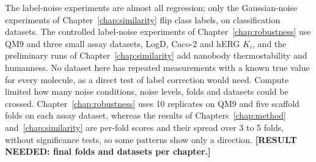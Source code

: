 The label-noise experiments are almost all regression; only the Gaussian-noise experiments of Chapter~\ref{chap:similarity} flip class labels, on classification datasets. %
The controlled label-noise experiments of Chapter~\ref{chap:robustness} use QM9 and three small assay datasets, LogD, Caco-2 and hERG $K_i$, and the preliminary runs of Chapter~\ref{chap:similarity} add nanobody thermostability and humanness. No dataset here has repeated measurements with a known true value for every molecule, as a direct test of label correction would need. Compute limited how many noise conditions, noise levels, folds and datasets could be crossed. Chapter~\ref{chap:robustness} uses 10 replicates on QM9 and five scaffold folds on each assay dataset, whereas the results of Chapters~\ref{chap:method} and~\ref{chap:similarity} are per-fold scores and their spread over 3 to 5 folds, without significance tests, so some patterns show only a direction. \textbf{[RESULT NEEDED: final folds and datasets per chapter.]}



